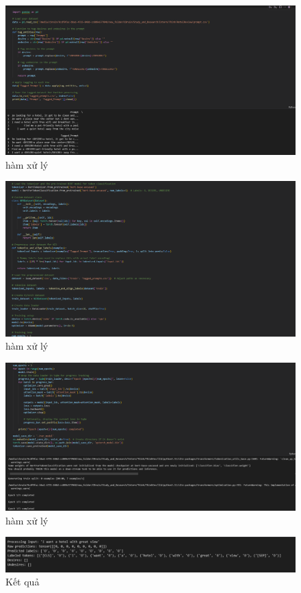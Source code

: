 \begin{figure}[H]
    \centering
    \includegraphics[width=0.8\linewidth]{Figures/code_result_1.png}
    \caption{hàm xử lý}
    \label{fig:enter-label}
\end{figure}

\begin{figure}[H]
    \centering
    \includegraphics[width=0.8\linewidth]{Figures/code_result_2.png}
    \caption{hàm xử lý}
    \label{fig:enter-label}
\end{figure}

\begin{figure}[H]
    \centering
    \includegraphics[width=0.8\linewidth]{Figures/code_result_3.png}
    \caption{hàm xử lý}
    \label{fig:enter-label}
\end{figure}

\begin{figure}[H]
    \centering
    \includegraphics[width=0.8\linewidth]{Figures/result_4_10.png}
    \caption{Kết quả}
    \label{fig:enter-label}
\end{figure}


